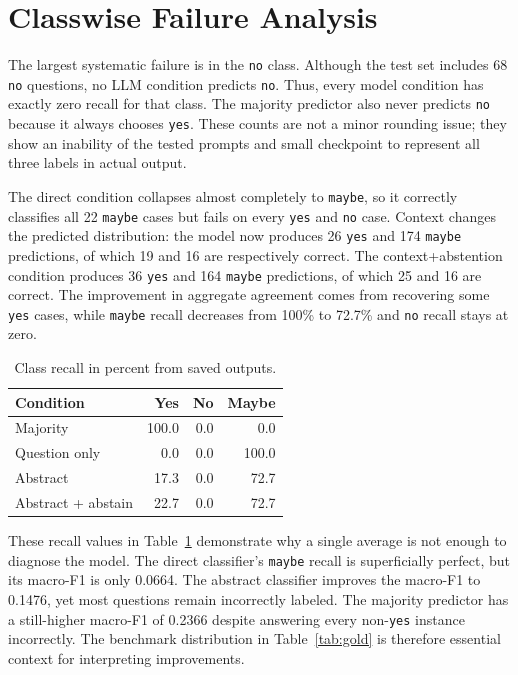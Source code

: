 \documentclass[conference]{IEEEtran}
\begin{document}
\section{Classwise Failure Analysis}
The largest systematic failure is in the \texttt{no} class. Although the test set includes 68 \texttt{no} questions, no LLM condition predicts \texttt{no}. Thus, every model condition has exactly zero recall for that class. The majority predictor also never predicts \texttt{no} because it always chooses \texttt{yes}. These counts are not a minor rounding issue; they show an inability of the tested prompts and small checkpoint to represent all three labels in actual output.

The direct condition collapses almost completely to \texttt{maybe}, so it correctly classifies all 22 \texttt{maybe} cases but fails on every \texttt{yes} and \texttt{no} case. Context changes the predicted distribution: the model now produces 26 \texttt{yes} and 174 \texttt{maybe} predictions, of which 19 and 16 are respectively correct. The context+abstention condition produces 36 \texttt{yes} and 164 \texttt{maybe} predictions, of which 25 and 16 are correct. The improvement in aggregate agreement comes from recovering some \texttt{yes} cases, while \texttt{maybe} recall decreases from 100\% to 72.7\% and \texttt{no} recall stays at zero.

\begin{table}[t]
\centering
\caption{Class recall in percent from saved outputs.}
\label{tab:recall}
\begin{tabular}{lrrr}
\toprule
Condition & Yes & No & Maybe \\
\midrule
Majority & 100.0 & 0.0 & 0.0 \\
Question only & 0.0 & 0.0 & 100.0 \\
Abstract & 17.3 & 0.0 & 72.7 \\
Abstract + abstain & 22.7 & 0.0 & 72.7 \\
\bottomrule
\end{tabular}
\end{table}

These recall values in Table~\ref{tab:recall} demonstrate why a single average is not enough to diagnose the model. The direct classifier's \texttt{maybe} recall is superficially perfect, but its macro-F1 is only 0.0664. The abstract classifier improves the macro-F1 to 0.1476, yet most questions remain incorrectly labeled. The majority predictor has a still-higher macro-F1 of 0.2366 despite answering every non-\texttt{yes} instance incorrectly. The benchmark distribution in Table~\ref{tab:gold} is therefore essential context for interpreting improvements.
\end{document}
